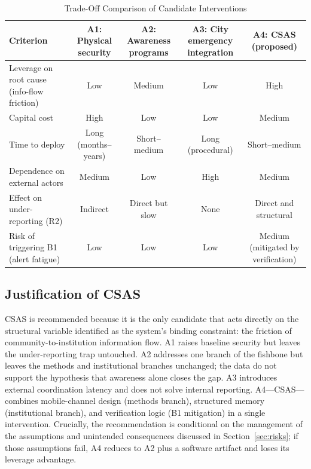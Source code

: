 \documentclass[conference]{IEEEtran}
\begin{document}
\begin{table}[t]
\caption{Trade-Off Comparison of Candidate Interventions}
\label{tab:tradeoffs}
\centering
\renewcommand{\arraystretch}{1.25}
\begin{tabular}{p{3.4cm}cccc}
\toprule
\textbf{Criterion} & \textbf{A1: Physical security} & \textbf{A2: Awareness programs} & \textbf{A3: City emergency integration} & \textbf{A4: CSAS (proposed)} \\
\midrule
Leverage on root cause (info-flow friction) & Low & Medium & Low & High \\
Capital cost & High & Low & Low & Medium \\
Time to deploy & Long (months--years) & Short--medium & Long (procedural) & Short--medium \\
Dependence on external actors & Medium & Low & High & Medium \\
Effect on under-reporting (R2) & Indirect & Direct but slow & None & Direct and structural \\
Risk of triggering B1 (alert fatigue) & Low & Low & Low & Medium (mitigated by verification) \\
\bottomrule
\end{tabular}
\end{table}

\subsection{Justification of CSAS}
CSAS is recommended because it is the only candidate that acts
directly on the structural variable identified as the system's
binding constraint: the friction of community-to-institution
information flow. A1 raises baseline security but leaves the
under-reporting trap untouched. A2 addresses one branch of the
fishbone but leaves the methods and institutional branches
unchanged; the data do not support the hypothesis that awareness
alone closes the gap. A3 introduces external coordination latency
and does not solve internal reporting. A4---CSAS---combines
mobile-channel design (methods branch), structured memory
(institutional branch), and verification logic (B1 mitigation) in
a single intervention. Crucially, the recommendation is conditional
on the management of the assumptions and unintended consequences
discussed in Section~\ref{sec:risks}; if those assumptions fail,
A4 reduces to A2 plus a software artifact and loses its leverage
advantage.

\end{document}
